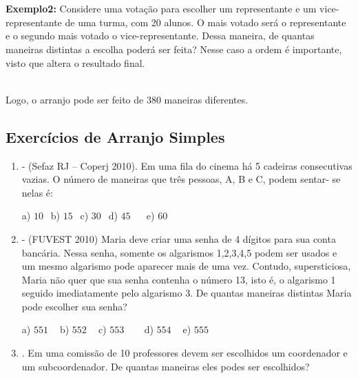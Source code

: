 \begin{multicols*}{2}
	\\

	\\

	\textbf{Exemplo2: } Considere uma votação para escolher um representante e um vice-representante de uma turma, com 20 alunos. O mais votado será o representante e o segundo mais votado o vice-representante. Dessa maneira, de quantas maneiras distintas a escolha poderá ser feita? Nesse caso a ordem é importante, visto que altera o resultado final.


	\\

	Logo, o arranjo pode ser feito de 380 maneiras diferentes.

	\subsection{Exercícios de Arranjo Simples}

	\begin{enumerate}

		\item - (Sefaz RJ – Coperj 2010). Em uma fila do cinema há 5 cadeiras consecutivas
		      vazias. O número de maneiras que três pessoas, A, B e C, podem sentar- se nelas é:

		      a) $10 \ \ $ b) $15 \ \ $ c) $30 \ \ $ d) $45 \ \ \ \ \ \ $ e) $60 \ \ $

		\item - (FUVEST 2010) Maria deve criar uma senha de 4 dígitos para sua conta bancária.
		      Nessa senha, somente os algarismos 1,2,3,4,5 podem ser usados e um mesmo algarismo pode
		      aparecer mais de uma vez. Contudo, supersticiosa, Maria não quer que sua senha contenha o
		      número 13, isto é, o algarismo 1 seguido imediatamente pelo algarismo 3. De quantas maneiras
		      distintas Maria pode escolher sua senha?

		      a) $551 \ \ \ \ $ b) $552 \ \ \ \ $ c) $553 \ \ \ \ \ \ \ \ $ d) $554 \ \ \ \ $ e) $555 \ \ $

		\item . Em uma comissão de 10 professores devem ser escolhidos um coordenador e um subcoordenador. De quantas maneiras eles podes ser escolhidos?


\end{enumerate}
\end{multicols*}
